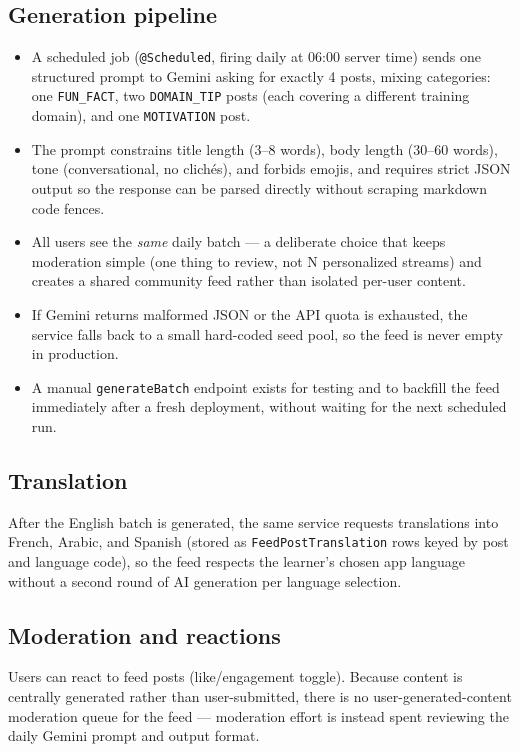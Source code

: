 \documentclass[a4paper,12pt]{report}
\begin{document}
\subsection{Generation pipeline}
\begin{itemize}[leftmargin=*]
  \item A scheduled job (\texttt{@Scheduled}, firing daily at 06:00
        server time) sends one structured prompt to Gemini asking for
        exactly 4 posts, mixing categories: one \texttt{FUN\_FACT}, two
        \texttt{DOMAIN\_TIP} posts (each covering a different training
        domain), and one \texttt{MOTIVATION} post.
  \item The prompt constrains title length (3--8 words), body length
        (30--60 words), tone (conversational, no clichés), and forbids
        emojis, and requires strict JSON output so the response can be
        parsed directly without scraping markdown code fences.
  \item All users see the \emph{same} daily batch --- a deliberate choice
        that keeps moderation simple (one thing to review, not N
        personalized streams) and creates a shared community feed rather
        than isolated per-user content.
  \item If Gemini returns malformed JSON or the API quota is exhausted,
        the service falls back to a small hard-coded seed pool, so the
        feed is never empty in production.
  \item A manual \texttt{generateBatch} endpoint exists for testing and to
        backfill the feed immediately after a fresh deployment, without
        waiting for the next scheduled run.
\end{itemize}

\subsection{Translation}
After the English batch is generated, the same service requests
translations into French, Arabic, and Spanish (stored as
\texttt{FeedPostTranslation} rows keyed by post and language code), so the
feed respects the learner's chosen app language without a second round
of AI generation per language selection.

\subsection{Moderation and reactions}
Users can react to feed posts (like/engagement toggle). Because content
is centrally generated rather than user-submitted, there is no
user-generated-content moderation queue for the feed --- moderation
effort is instead spent reviewing the daily Gemini prompt and output
format.
\end{document}

